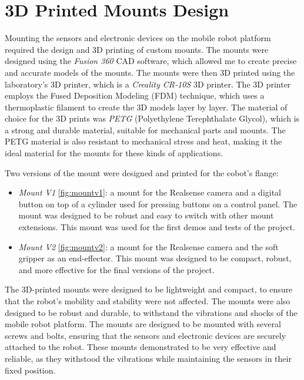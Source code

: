\section{3D Printed Mounts Design}

Mounting the sensors and electronic devices on the mobile robot platform required the design and 3D printing
of custom mounts. The mounts were designed using the \textit{Fusion 360} CAD software, which allowed me to create
precise and accurate models of the mounts. The mounts were then 3D printed using the laboratory's 3D printer,
which is a \textit{Creality CR-10S} 3D printer. The 3D printer employs the Fused Deposition Modeling (FDM) technique,
which uses a thermoplastic filament to create the 3D models layer by layer. The material of choice
for the 3D prints was \textit{PETG} (Polyethylene Terephthalate Glycol), which is a strong and durable material,
suitable for mechanical parts and mounts. The PETG material is also resistant to mechanical stress and heat,
making it the ideal material for the mounts for these kinds of applications.

Two versions of the mount were designed and printed for the cobot's flange:

\begin{itemize}
    \item \textit{Mount V1} \ref{fig:mountv1}: a mount for the Realsense camera and a digital button on top of a cylinder used
    for pressing buttons on a control panel. The mount was designed to be robust and easy to switch with other
    mount extensions. This mount was used for the first demos and tests of the project.
    \item \textit{Mount V2} \ref{fig:mountv2}: a mount for the Realsense camera and the soft gripper as an end-effector.
    This mount was designed to be compact, robust, and more effective for the final versions of the project.
\end{itemize}

The 3D-printed mounts were designed to be lightweight and compact, to ensure that the robot's mobility and stability
were not affected. The mounts were also designed to be robust and durable, to withstand the vibrations and shocks
of the mobile robot platform. The mounts are designed to be
mounted with several screws and bolts, ensuring that the sensors and electronic devices are securely attached to the robot.
These mounts demonstrated to be very effective and reliable, as they withstood the vibrations while maintaining
the sensors in their fixed position.

